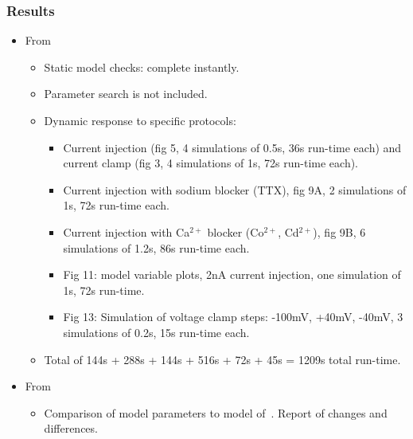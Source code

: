 \documentclass[12pt]{article}
\begin{document}
\subsubsection*{Results}

\begin{itemize}
\item From~\cite{De-Schutter-E:1994vn}

  \begin{itemize}
  \item Static model checks: complete instantly.
  \item Parameter search is not included.
  \item Dynamic response to specific protocols:
    \begin{itemize}
    \item Current injection (fig 5, 4 simulations of 0.5s, 36s
      run-time each) and current clamp (fig 3, 4 simulations of 1s,
      72s run-time each).
    \item Current injection with sodium blocker (TTX), fig 9A, 2
      simulations of 1s, 72s run-time each.
    \item Current injection with Ca$^{2+}$ blocker (Co$^{2+}$,
      Cd$^{2+}$), fig 9B, 6 simulations of 1.2s, 86s run-time each.
    \item Fig 11: model variable plots, 2nA current injection, one
      simulation of 1s, 72s run-time.
    \item Fig 13: Simulation of voltage clamp steps: -100mV, +40mV,
      -40mV, 3 simulations of 0.2s, 15s run-time each.
    \end{itemize}

  \item Total of 144s + 288s + 144s + 516s + 72s + 45s = 1209s total
    run-time.
  \end{itemize}


\item From~\cite{E:1994hc}

  \begin{itemize}
  \item Comparison of model parameters to model
    of~\cite{De-Schutter-E:1994vn}.  Report of changes and
    differences.


\end{itemize}
\end{itemize}
\end{document}
